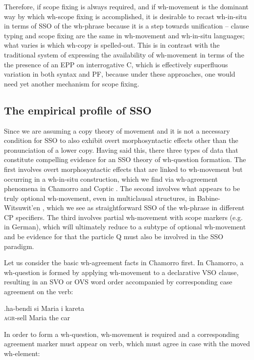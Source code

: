 \documentclass[11pt]{article}
\begin{document}
Therefore, if scope fixing is always required, and if wh-movement is the dominant way by which wh-scope fixing is accomplished, it is desirable to recast wh-in-situ in terms of SSO of the wh-phrase because it is a step towards unification -- clause typing and scope fixing are the same in wh-movement and wh-in-situ languages; what varies is which wh-copy is spelled-out. This is in contrast with the traditional system of expressing the availability of wh-movement in terms of the the presence of an EPP on interrogative C, which is effectively superfluous variation in both syntax and PF, because under these approaches, one would need yet another mechanism for scope fixing.

\subsection{The empirical profile of SSO}
Since we are assuming a copy theory of movement and it is not a necessary condition for SSO to also exhibit overt morphosyntactic effects other than the pronunciation of a lower copy. Having said this, there three types of data that constitute compelling evidence for an SSO theory of wh-question formation. The first involves overt morphosyntactic effects that are linked to wh-movement but occurring in a wh-in-situ construction, which we find via wh-agreement phenomena in Chamorro and Coptic \citep{rlc:2006}. The second involves what appears to be truly optional wh-movement, even in multiclausal structures, in Babine-Witsuwit'en \citep{denham:1997,denham:2000}, which we see as straightforward SSO of the wh-phrase in different CP specifiers. The third involves partial wh-movement with scope markers (e.g. in German), which will ultimately reduce to a subtype of optional wh-movement and be evidence for that the particle Q must also be involved in the SSO paradigm.

Let us consider the basic wh-agreement facts in Chamorro first. In Chamorro, a wh-question is formed by applying wh-movement to a declarative VSO clause, resulting in an SVO or OVS word order accompanied by corresponding case agreement on the verb:

\exg.\label{wh.110}ha-bendi si Maria i kareta\\
   \textsc{agr}-sell {} Maria the car\\

In order to form a wh-question, wh-movement is required and a corresponding agreement marker must appear on verb, which must agree in case with the moved wh-element:
\end{document}
